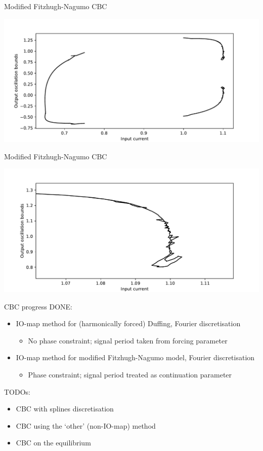 \documentclass[presentation]{beamer}
\begin{document}
\begin{frame}[label={sec:org4c3586e}]{Modified Fitzhugh-Nagumo CBC}
\begin{center}
\includegraphics[width=.9\linewidth]{./simplified_FH_CBC_2.pdf}
\end{center}
\end{frame}


\begin{frame}[label={sec:org56234e0}]{Modified Fitzhugh-Nagumo CBC}
\begin{center}
\includegraphics[width=.9\linewidth]{./simplified_FH_CBC_zoom.pdf}
\end{center}
\end{frame}

\begin{frame}[<+->][label={sec:orgc58b339}]{CBC progress}
DONE:
\begin{itemize}
\item IO-map method for (harmonically forced) Duffing, Fourier discretisation
\begin{itemize}
\item No phase constraint; signal period taken from forcing parameter
\end{itemize}
\item IO-map method for modified Fitzhugh-Nagumo model, Fourier discretisation
\begin{itemize}
\item Phase constraint; signal period treated as continuation parameter
\end{itemize}
\end{itemize}

\vfill
TODOs:
\begin{itemize}
\item CBC with splines discretisation
\item CBC using the `other' (non-IO-map) method
\item CBC on the equilibrium
\end{itemize}
\end{frame}
\end{document}
